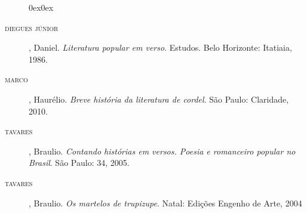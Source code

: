\documentclass[11pt]{hedrabook_ficha}
\begin{document}
\begin{description}0ex\parsep0ex
\newcommand{\tit}[1]{\item[\textnormal{\textsc{\MakeTextLowercase{#1}}}]}
\newcommand{\titidem}{\item[\line(1,0){25}]}

\tit{DIEGUES JÚNIOR}, Daniel. \textit{Literatura popular em verso}. Estudos. Belo Horizonte: Itatiaia, 1986. 

\tit{MARCO}, Haurélio. \textit{Breve história da literatura de cordel}. São Paulo: Claridade, 2010.

\tit{TAVARES}, Braulio. \textit{Contando histórias em versos. Poesia e romanceiro popular no Brasil}. São Paulo: 34, 2005.

\tit{TAVARES}, Braulio. \textit{Os martelos de trupizupe}. Natal: Edições Engenho de Arte, 2004 

\end{description}
\end{document}
